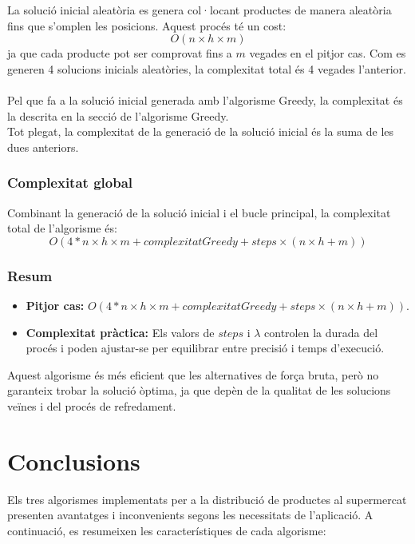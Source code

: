 \documentclass[a4paper,12pt]{report}
\begin{document}
\begin{itemize}
La solució inicial aleatòria es genera col·locant productes de manera aleatòria fins que s'omplen les posicions. Aquest procés té un cost:
\[
O(n \times h \times m)
\]
ja que cada producte pot ser comprovat fins a \(m\) vegades en el pitjor cas. Com es generen 4 solucions inicials aleatòries, la complexitat total és 4 vegades l'anterior.\\
\\
Pel que fa a la solució inicial generada amb l'algorisme Greedy, la complexitat és la descrita en la secció de l'algorisme Greedy.\\ 
Tot plegat, la complexitat de la generació de la solució inicial és la suma de les dues anteriors.

\subsubsection{Complexitat global}

Combinant la generació de la solució inicial i el bucle principal, la complexitat total de l'algorisme és:
\[
O(4 * n \times h \times m + complexitatGreedy + steps \times (n \times h + m))
\]

\subsubsection{Resum}

\begin{itemize}
    \item \textbf{Pitjor cas:} \(O(4 * n \times h \times m + complexitatGreedy + steps \times (n \times h + m))\).
    \item \textbf{Complexitat pràctica:} Els valors de \(steps\) i \(\lambda\) controlen la durada del procés i poden ajustar-se per equilibrar entre precisió i temps d'execució.
\end{itemize}

Aquest algorisme és més eficient que les alternatives de força bruta, però no garanteix trobar la solució òptima, ja que depèn de la qualitat de les solucions veïnes i del procés de refredament.

\section{Conclusions}	

Els tres algorismes implementats per a la distribució de productes al supermercat presenten avantatges i inconvenients segons les necessitats de l'aplicació. A continuació, es resumeixen les característiques de cada algorisme:


\end{itemize}
\end{document}
